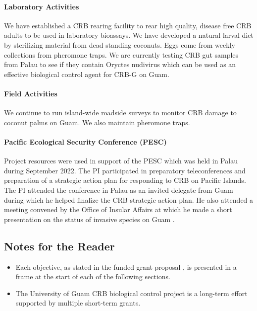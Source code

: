 \documentclass[12pt,letterpaper,english,bibliography=totocnumbered, abstract=on]{scrartcl}
\begin{document}
\paragraph{Laboratory Activities}
	We have established a CRB rearing facility to rear high quality, disease free CRB adults to be used in laboratory bioassays. We have developed a natural larval diet by sterilizing material from dead standing coconuts. Eggs come from weekly collections from pheromone traps. We are currently testing CRB gut samples from Palau to see if they contain Oryctes nudivirus which can be used as an effective biological control agent for CRB-G on Guam.
	
\paragraph{Field Activities}	
	We continue to run island-wide roadside surveys to monitor CRB damage to coconut palms on Guam. We also maintain pheromone traps.
	
\paragraph{Pacific Ecological Security Conference (PESC)}	
	 Project resources were used in support of the PESC which was held in Palau during September 2022. The PI participated in preparatory teleconferences and preparation of a strategic action plan for responding to CRB on Pacific Islands. The PI attended the conference in Palau as an invited delegate from Guam during which he helped finalize the CRB strategic action plan. He also attended a meeting convened by the Office of Insular Affairs at which he made a short presentation on the status of invasive species on Guam \cite{mooreOverviewInvasiveSpecies2022}.

\newpage

\subsection*{Notes for the Reader}

\begin{itemize}

\item Each objective, as stated in the funded grant proposal \cite{mooreGrantProposalDOIOIA2020}, is presented in a frame at the start of each of the following sections. 

\item The University of Guam CRB biological control project is a long-term effort supported by multiple short-term grants.  

\end{itemize}
\end{document}
